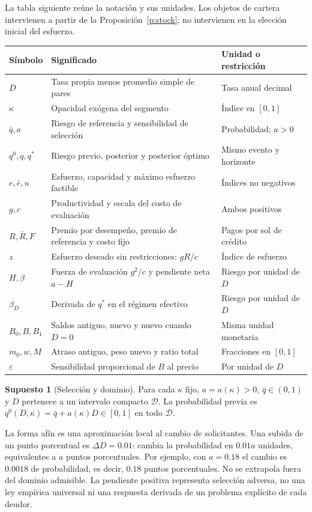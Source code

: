 \documentclass[11pt]{article}
\theoremstyle{definition}\newtheorem{assumption}{Supuesto}
\begin{document}
La tabla siguiente reúne la notación y sus unidades. Los objetos de cartera
intervienen a partir de la Proposición~\ref{p:stock}; no intervienen en la elección inicial
del esfuerzo.
\begin{center}\small
\begin{tabular}{@{}L{.15\linewidth}L{.51\linewidth}L{.27\linewidth}@{}}
\toprule Símbolo & Significado & Unidad o restricción\\\midrule
$D$ & Tasa propia menos promedio simple de pares & Tasa anual decimal\\
$\kappa$ & Opacidad exógena del segmento & Índice en $[0,1]$\\
$\bar q,a$ & Riesgo de referencia y sensibilidad de selección & Probabilidad; $a>0$\\
$q^0,q,q^*$ & Riesgo previo, posterior y posterior óptimo & Mismo evento y horizonte\\
$e,\bar e,u$ & Esfuerzo, capacidad y máximo esfuerzo factible & Índices no negativos\\
$g,c$ & Productividad y escala del costo de evaluación & Ambos positivos\\
$R,\bar R,F$ & Premio por desempeño, premio de referencia y costo fijo & Pagos por sol de crédito\\
$z$ & Esfuerzo deseado sin restricciones: $gR/c$ & Índice de esfuerzo\\
$H,\beta$ & Fuerza de evaluación $g^2/c$ y pendiente neta $a-H$ & Riesgo por unidad de $D$\\
$\beta_D$ & Derivada de $q^*$ en el régimen efectivo & Riesgo por unidad de $D$\\
$B_0,B,B_1$ & Saldos antiguo, nuevo y nuevo cuando $D=0$ & Misma unidad monetaria\\
$m_0,w,M$ & Atraso antiguo, peso nuevo y ratio total & Fracciones en $[0,1]$\\
$\varepsilon$ & Sensibilidad proporcional de $B$ al precio & Por unidad de $D$\\
\bottomrule
\end{tabular}
\end{center}

\begin{assumption}[Selección y dominio]\label{as:selection}
Para cada $\kappa$ fijo, $a=a(\kappa)>0$, $\bar q\in(0,1)$ y $D$ pertenece
a un intervalo compacto $\mathcal D$. La probabilidad previa es
$q^0(D,\kappa)=\bar q+a(\kappa)D\in[0,1]$ en todo $\mathcal D$.
\end{assumption}
La forma afín es una aproximación local al cambio de solicitantes. Una subida
de un punto porcentual es $\Delta D=0.01$: cambia la probabilidad en $0.01a$
unidades, equivalentes a $a$ puntos porcentuales. Por ejemplo, con $a=0.18$
el cambio es $0.0018$ de probabilidad, es decir, $0.18$ puntos porcentuales.
No se extrapola fuera del dominio admisible. La pendiente positiva representa
selección adversa, no una ley empírica universal ni una respuesta derivada de
un problema explícito de cada deudor.
\end{document}
